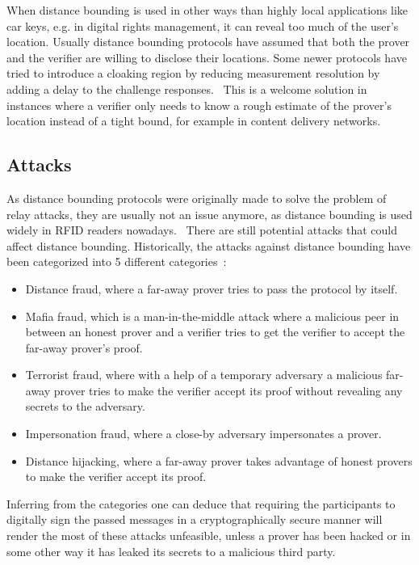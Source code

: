 When distance bounding is used in other ways than highly local applications like car keys, e.g. in digital rights management, it can reveal too much of the user's location. Usually distance bounding protocols have assumed that both the prover and the verifier are willing to disclose their locations. Some newer protocols have tried to introduce a cloaking region by reducing measurement resolution by adding a delay to the challenge responses.~\cite{Molina-Martinez2018-nw} This is a welcome solution in instances where a verifier only needs to know a rough estimate of the prover's location instead of a tight bound, for example in content delivery networks.

\subsection{Attacks}
As distance bounding protocols were originally made to solve the problem of relay attacks, they are usually not an issue anymore, as distance bounding is used widely in RFID readers nowadays.~\cite{Nikov_undated-vv} There are still potential attacks that could affect distance bounding. Historically, the attacks against distance bounding have been categorized into 5 different categories~\cite{Boureanu_undated-bn}:

\begin{itemize}
  \item Distance fraud, where a far-away prover tries to pass the protocol by itself.
  \item Mafia fraud, which is a man-in-the-middle attack where a malicious peer in between an honest prover and a verifier tries to get the verifier to accept the far-away prover's proof.
  \item Terrorist fraud, where with a help of a temporary adversary a malicious far-away prover tries to make the verifier accept its proof without revealing any secrets to the adversary.
  \item Impersonation fraud, where a close-by adversary impersonates a prover.
  \item Distance hijacking, where a far-away prover takes advantage of honest provers to make the verifier accept its proof.
\end{itemize}

Inferring from the categories one can deduce that requiring the participants to digitally sign the passed messages in a cryptographically secure manner will render the most of these attacks unfeasible, unless a prover has been hacked or in some other way it has leaked its secrets to a malicious third party.
